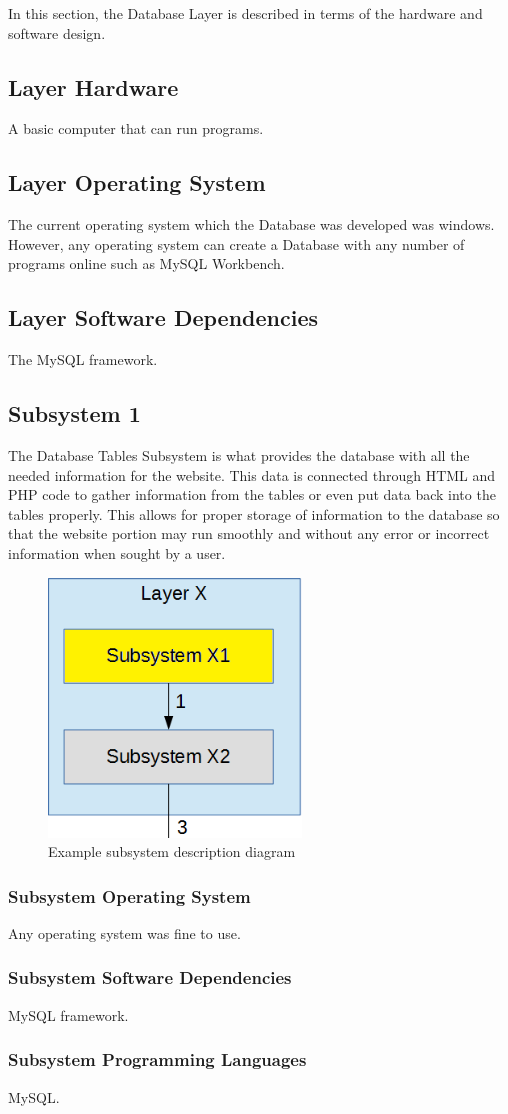 In this section, the Database Layer is described in terms of the hardware and software design.

\subsection{Layer Hardware}
A basic computer that can run programs.

\subsection{Layer Operating System}
The current operating system which the Database was developed was windows. However, any operating system can create a Database with any number of programs online such as MySQL Workbench.

\subsection{Layer Software Dependencies}
The MySQL framework.

\subsection{Subsystem 1}
The Database Tables Subsystem is what provides the database with all the needed information for the website. This data is connected through HTML and PHP code to gather information from the tables or even put data back into the tables properly. This allows for proper storage of information to the database so that the website portion may run smoothly and without any error or incorrect information when sought by a user.

\begin{figure}[h!]
	\centering
 	\includegraphics[width=0.60\textwidth]{images/subsystem}
 \caption{Example subsystem description diagram}
\end{figure}

\subsubsection{Subsystem Operating System}
Any operating system was fine to use.

\subsubsection{Subsystem Software Dependencies}
MySQL framework.

\subsubsection{Subsystem Programming Languages}
MySQL.